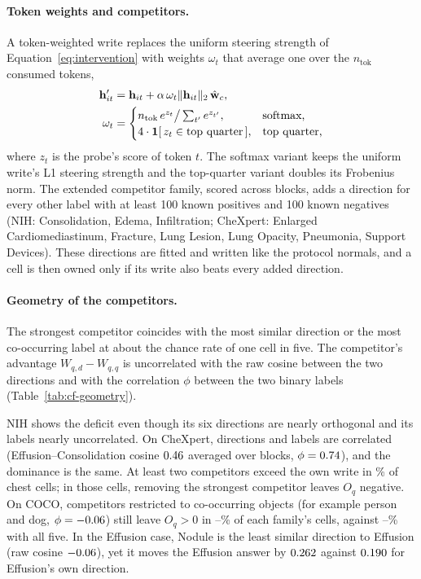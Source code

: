 \paragraph{Token weights and competitors.} A token-weighted write replaces the uniform steering strength of Equation~\ref{eq:intervention} with weights $\omega_t$ that average one over the $n_{\mathrm{tok}}$ consumed tokens,
\begin{equation}
\begin{aligned}
\mathbf{h}'_{it}&=\mathbf{h}_{it}+\alpha\,\omega_t\lVert\mathbf{h}_{it}\rVert_2\,\hat{\mathbf{w}}_c,\\
\omega_t&=\begin{cases}
n_{\mathrm{tok}}\,e^{z_t}\big/\sum_{t'}e^{z_{t'}}, & \text{softmax,}\\
4\cdot\mathbf 1[\,z_t\in\text{top quarter}\,], & \text{top quarter,}
\end{cases}
\end{aligned}
\label{eq:token-weights}
\end{equation}
where $z_t$ is the probe's score of token $t$. The softmax variant keeps the uniform write's L1 steering strength and the top-quarter variant doubles its Frobenius norm. The extended competitor family, scored across \cfExtcompBlocks{} blocks, adds a direction for every other label with at least 100 known positives and 100 known negatives (NIH: Consolidation, Edema, Infiltration; CheXpert: Enlarged Cardiomediastinum, Fracture, Lung Lesion, Lung Opacity, Pneumonia, Support Devices). These directions are fitted and written like the protocol normals, and a cell is then owned only if its write also beats every added direction.



\paragraph{Geometry of the competitors.} The strongest competitor coincides with the most similar direction or the most co-occurring label at about the chance rate of one cell in five. The competitor's advantage $W_{q,d}-W_{q,q}$ is uncorrelated with the raw cosine between the two directions and with the correlation $\phi$ between the two binary labels (Table~\ref{tab:cf-geometry}).

NIH shows the deficit even though its six directions are nearly orthogonal and its labels nearly uncorrelated. On CheXpert, directions and labels are correlated (Effusion--Consolidation cosine $0.46$ averaged over blocks, $\phi=0.74$), and the dominance is the same. At least two competitors exceed the own write in \cfGeoTwoAbovePct\% of chest cells; in those cells, removing the strongest competitor leaves $O_q$ negative. On COCO, competitors restricted to co-occurring objects (for example person and dog, $\phi=-0.06$) still leave $O_q>0$ in \cfGeoCocoFamMinPct{}--\cfGeoCocoFamMaxPct\% of each family's cells, against \cfGeoCocoFamFullMinPct{}--\cfGeoCocoFamFullMaxPct\% with all five. In the Effusion case, Nodule is the least similar direction to Effusion (raw cosine $-0.06$), yet it moves the Effusion answer by $0.262$ against $0.190$ for Effusion's own direction.

